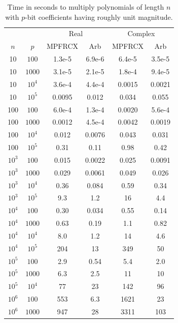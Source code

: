 \documentclass[10pt,journal,compsoc,cspaper]{IEEEtran}
\begin{document}
\begin{table}
\caption{Time in seconds to multiply polynomials of length $n$
with $p$-bit coefficients having roughly unit magnitude.}
\label{tab:polymultime1}
\begin{center}
\renewcommand{\arraystretch}{1.2}
\begin{tabular}{cc|cc|cc}
\multicolumn{2}{c}{ } & \multicolumn{2}{c}{Real} & \multicolumn{2}{c}{Complex} \\
$n$ & $p$ & MPFRCX & Arb & MPFRCX & Arb \\ \hline
10 & $100$ & 1.3e-5 & 6.9e-6 & 6.4e-5 & 3.5e-5 \\
10 & $1000$ & 3.1e-5 & 2.1e-5 & 1.8e-4 & 9.4e-5 \\
10 & $10^4$ & 3.6e-4 & 4.4e-4 & 0.0015 & 0.0021 \\
10 & $10^5$ & 0.0095 & 0.012 & 0.034 & 0.055 \\ \hline
100 & $100$ & 6.0e-4 & 1.3e-4 & 0.0020 & 5.6e-4 \\
100 & $1000$ & 0.0012 & 4.5e-4 & 0.0042 & 0.0019  \\
100 & $10^4$ & 0.012 & 0.0076 & 0.043 & 0.031  \\
100 & $10^5$ & 0.31 & 0.11 & 0.98 & 0.42 \\ \hline
$10^3$ & $100$ & 0.015 & 0.0022 & 0.025 & 0.0091 \\
$10^3$ & $1000$ & 0.029 & 0.0061 & 0.049 & 0.026 \\
$10^3$ & $10^4$ & 0.36 & 0.084 & 0.59 & 0.34 \\
$10^3$ & $10^5$ & 9.3 & 1.2 & 16 & 4.4 \\ \hline
$10^4$ & $100$ & 0.30 & 0.034 & 0.55 & 0.14 \\
$10^4$ & $1000$ & 0.63 & 0.19 & 1.1 & 0.82 \\
$10^4$ & $10^4$ & 8.0 & 1.2 & 14 & 4.6 \\
$10^4$ & $10^5$ & 204 & 13 & 349 & 50 \\ \hline
$10^5$ & $100$ & 2.9 & 0.54 & 5.4 & 2.0 \\
$10^5$ & $1000$ & 6.3 & 2.5 & 11 & 10  \\
$10^5$ & $10^4$ & 77 & 23 & 142 & 96 \\ \hline
$10^6$ & $100$ & 553 & 6.3 & 1621 & 23 \\
$10^6$ & $1000$ & 947 & 28 & 3311 & 103 \\
\end{tabular}
\end{center}
\end{table}
\end{document}

